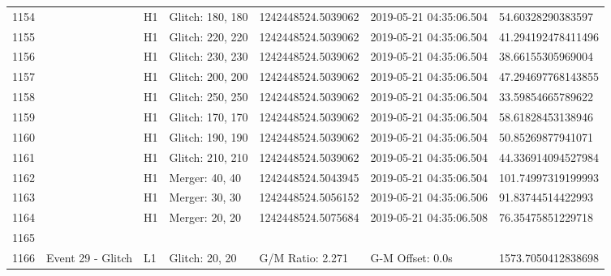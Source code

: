 \begin{longtable}{lllllll}
1154 &                                                    &       H1 &  Glitch: 180, 180 &  1242448524.5039062 &  2019-05-21 04:35:06.504 &   54.60328290383597 \\
1155 &                                                    &       H1 &  Glitch: 220, 220 &  1242448524.5039062 &  2019-05-21 04:35:06.504 &  41.294192478411496 \\
1156 &                                                    &       H1 &  Glitch: 230, 230 &  1242448524.5039062 &  2019-05-21 04:35:06.504 &   38.66155305969004 \\
1157 &                                                    &       H1 &  Glitch: 200, 200 &  1242448524.5039062 &  2019-05-21 04:35:06.504 &  47.294697768143855 \\
1158 &                                                    &       H1 &  Glitch: 250, 250 &  1242448524.5039062 &  2019-05-21 04:35:06.504 &   33.59854665789622 \\
1159 &                                                    &       H1 &  Glitch: 170, 170 &  1242448524.5039062 &  2019-05-21 04:35:06.504 &   58.61828453138946 \\
1160 &                                                    &       H1 &  Glitch: 190, 190 &  1242448524.5039062 &  2019-05-21 04:35:06.504 &   50.85269877941071 \\
1161 &                                                    &       H1 &  Glitch: 210, 210 &  1242448524.5039062 &  2019-05-21 04:35:06.504 &  44.336914094527984 \\
1162 &                                                    &       H1 &    Merger: 40, 40 &  1242448524.5043945 &  2019-05-21 04:35:06.504 &  101.74997319199993 \\
1163 &                                                    &       H1 &    Merger: 30, 30 &  1242448524.5056152 &  2019-05-21 04:35:06.506 &   91.83744514422993 \\
1164 &                                                    &       H1 &    Merger: 20, 20 &  1242448524.5075684 &  2019-05-21 04:35:06.508 &   76.35475851229718 \\
1165 &                                                    &          &                   &                     &                          &                     \\
1166 &                                  Event 29 - Glitch &       L1 &    Glitch: 20, 20 &    G/M Ratio: 2.271 &         G-M Offset: 0.0s &  1573.7050412838698 \\

\end{longtable}
